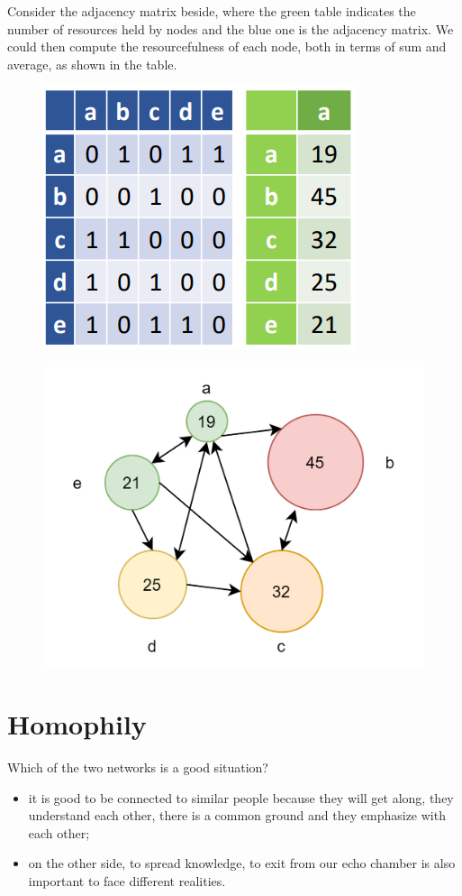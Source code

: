 \documentclass[
  notitlepage,
  onecolumn,
  openany]{book}
\providecommand{\tightlist}{%
  \setlength{\itemsep}{0pt}\setlength{\parskip}{0pt}}
\begin{document}
Consider the adjacency matrix beside, where the green table indicates the number of resources held by nodes and the blue one is the adjacency matrix. We could then compute the resourcefulness of each node, both in terms of sum and average, as shown in the table.

\begin{figure}[h!]

{\centering \includegraphics[width=0.3\linewidth]{images/06-Attributes based measures/Untitled 1} 

}

\end{figure}

\begin{figure}[h!]

{\centering \includegraphics[width=0.5\linewidth]{images/06-Attributes based measures/08-graph} 

}

\end{figure}

\hypertarget{homophily}{%
\section{Homophily}\label{homophily}}

Which of the two networks is a good situation?

\begin{itemize}
\tightlist
\item
  it is good to be connected to similar people because they will get along, they understand each other, there is a common ground and they emphasize with each other;
\item
  on the other side, to spread knowledge, to exit from our echo chamber is also important to face different realities.
\end{itemize}
\end{document}
